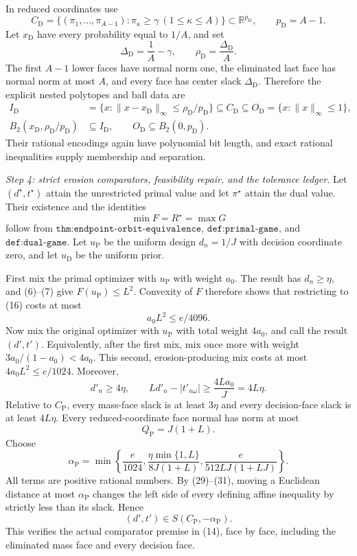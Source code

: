 In reduced coordinates use
\[
 C_{\mathrm D}=\{(\pi_1,\ldots,\pi_{A-1}):
                 \pi_\kappa\ge\gamma\ (1\le\kappa\le A)\}
       \subset\mathbb R^{p_{\mathrm D}},
 \qquad p_{\mathrm D}=A-1.
\tag{24}
\]
Let \(x_{\mathrm D}\) have every probability equal to \(1/A\), and set
\[
 \Delta_{\mathrm D}=\frac1A-\gamma,
 \qquad \rho_{\mathrm D}=\frac{\Delta_{\mathrm D}}A.
\tag{25}
\]
The first \(A-1\) lower faces have normal norm one, the eliminated last face has normal norm at most \(A\), and every face has center slack \(\Delta_{\mathrm D}\).  Therefore the explicit nested polytopes and ball data are
\[
 \begin{split}
 I_{\mathrm D}&=\{x:\|x-x_{\mathrm D}\|_\infty
                         \le\rho_{\mathrm D}/p_{\mathrm D}\}
       \subseteq C_{\mathrm D}
       \subseteq O_{\mathrm D}=\{x:\|x\|_\infty\le1\},\\
 B_2(x_{\mathrm D},\rho_{\mathrm D}/p_{\mathrm D})
       &\subseteq I_{\mathrm D},
 \qquad O_{\mathrm D}\subseteq B_2(0,p_{\mathrm D}).
 \end{split}
\tag{26}
\]
Their rational encodings again have polynomial bit length, and exact rational inequalities supply membership and separation.

\emph{Step 4: strict erosion comparators, feasibility repair, and the tolerance ledger.}
Let \((d^\star,t^\star)\) attain the unrestricted primal value and let \(\pi^\star\) attain the dual value.  Their existence and the identities
\[
 \min F=R^\star=\max G
\tag{27}
\]
follow from \(\texttt{thm:endpoint-orbit-equivalence}\), \(\texttt{def:primal-game}\), and \(\texttt{def:dual-game}\).  Let \(u_{\mathrm P}\) be the uniform design \(d_n=1/J\) with decision coordinate zero, and let \(u_{\mathrm D}\) be the uniform prior.

First mix the primal optimizer with \(u_{\mathrm P}\) with weight \(a_0\).  The result has \(d_n\ge\eta\), and (6)--(7) give \(F(u_{\mathrm P})\le L^2\).  Convexity of \(F\) therefore shows that restricting to (16) costs at most
\[
 a_0L^2\le e/4096.
\tag{28}
\]
Now mix the original optimizer with \(u_{\mathrm P}\) with total weight \(4a_0\), and call the result \((d',t')\).  Equivalently, after the first mix, mix once more with weight \(3a_0/(1-a_0)<4a_0\).  This second, erosion-producing mix costs at most \(4a_0L^2\le e/1024\).  Moreover,
\[
 d'_n\ge4\eta,
 \qquad
 Ld'_n-|t'_{n\omega}|\ge \frac{4La_0}{J}=4L\eta.
\tag{29}
\]
Relative to \(C_{\mathrm P}\), every mass-face slack is at least \(3\eta\) and every decision-face slack is at least \(4L\eta\).  Every reduced-coordinate face normal has norm at most
\[
 Q_{\mathrm P}=J(1+L).
\tag{30}
\]
Choose
\[
 \alpha_{\mathrm P}=\min\left\{
   \frac e{1024},
   \frac{\eta\min\{1,L\}}{8J(1+L)},
   \frac e{512LJ(1+LJ)}
 \right\}.
\tag{31}
\]
All terms are positive rational numbers.  By (29)--(31), moving a Euclidean distance at most \(\alpha_{\mathrm P}\) changes the left side of every defining affine inequality by strictly less than its slack.  Hence
\[
 (d',t')\in S(C_{\mathrm P},-\alpha_{\mathrm P}).
\tag{32}
\]
This verifies the actual comparator premise in (14), face by face, including the eliminated mass face and every decision face.

